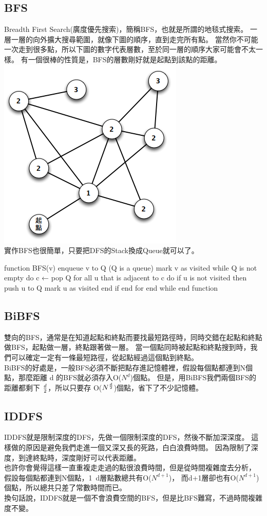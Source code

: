 \documentclass{article}
\begin{document}
\subsection{BFS}
Breadth First Search(廣度優先搜索)，簡稱BFS，也就是所謂的地毯式搜索。
一層一層的向外擴大搜尋範圍，就像下圖的順序，直到走完所有點。
當然你不可能一次走到很多點，所以下圖的數字代表層數，至於同一層的順序大家可能會不太一樣。
有一個很棒的性質是，BFS的層數剛好就是起點到該點的距離。\\
\includegraphics[width=0.5\columnwidth]{BFS.png}\\
實作BFS也很簡單，只要把DFS的Stack換成Queue就可以了。
\begin{algorithm}[caption={BFS}, label={alg1}]
function BFS(v)
    enqueue v to Q (Q is a queue)
    mark v as visited
    while Q is not empty do
        c ← pop Q
        for all u that is adjacent to c do
            if u is not visited then
                push u to Q
                mark u as visited
            end if
        end for
    end while
end function
\end{algorithm}

\subsection{BiBFS}
雙向的BFS，通常是在知道起點和終點而要找最短路徑時，同時交錯在起點和終點做BFS，起點做一層，終點跟著做一層。
當一個點同時被起點和終點搜到時，我們可以確定一定有一條最短路徑，從起點經過這個點到終點。\\
BiBFS的好處是，一般BFS必須不斷把點存進記憶體裡，假設每個點都連到N個點，那麼距離 d 的BFS就必須存入O($N^d$)個點。
但是，用BiBFS我們兩個BFS的距離都剩下 $d \over 2$，所以只要存 O($N^{d \over 2}$)個點，省下了不少記憶體。

\subsection{IDDFS}
IDDFS就是限制深度的DFS，先做一個限制深度的DFS，然後不斷加深深度。
這樣做的原因是避免我們走進一個又深又長的死路，白白浪費時間。
因為限制了深度，到達終點時，深度剛好可以代表距離。\\
也許你會覺得這樣一直重複走走過的點很浪費時間，但是從時間複雜度去分析，
假設每個點都連到N個點，1~d層點數總共有O($N^{d+1}$)，
而d+1層卻也有O($N^{d+1}$)個點，所以總共只差了常數時間而已。\\
換句話說，IDDFS就是一個不會浪費空間的BFS，但是比BFS難寫，不過時間複雜度不變。
\end{document}
